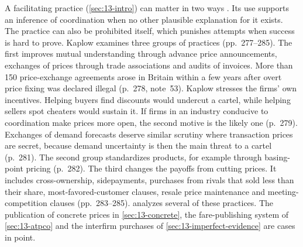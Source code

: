 A facilitating practice (\cref{sec:13-intro}) can matter in two ways \citep[pp.~276--277]{Kaplow2013}. Its use
supports an inference of coordination when no other plausible explanation for it exists. The practice can also be
prohibited itself, which punishes attempts when success is hard to prove. Kaplow examines three groups of practices
(pp.~277--285). The first improves mutual understanding through advance price announcements, exchanges of prices
through trade associations and audits of invoices. More than 150 price-exchange agreements arose in Britain within
a few years after overt price fixing was declared illegal (p.~278, note~53). Kaplow stresses the firms' own
incentives. Helping buyers find discounts would undercut a cartel, while helping sellers spot cheaters would
sustain it. If firms in an industry conducive to coordination make prices more open, the second motive is the
likely one (p.~279). Exchanges of demand forecasts deserve similar scrutiny where transaction prices are secret,
because demand uncertainty is then the main threat to a cartel (p.~281). The second group standardizes products,
for example through basing-point pricing (p.~282). The third changes the payoffs from cutting prices. It includes
cross-ownership, sidepayments, purchases from rivals that sold less than their share, most-favored-customer
clauses, resale price maintenance and meeting-competition clauses (pp.~283--285). 
analyzes several of these practices. The publication of concrete prices in \cref{sec:13-concrete}, the
fare-publishing system of \cref{sec:13-atpco} and the interfirm purchases of \cref{sec:13-imperfect-evidence} are
cases in point.

